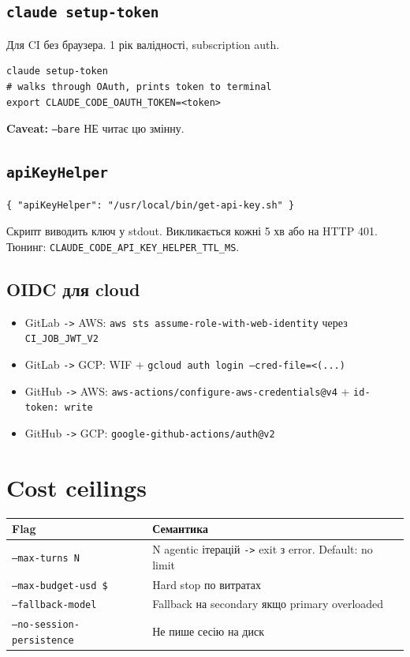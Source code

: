 \documentclass[11pt,a4paper]{article}
\begin{document}
\subsection{\texttt{claude setup-token}}

Для CI без браузера. 1 рік валідності, subscription auth.

\begin{lstlisting}
claude setup-token
# walks through OAuth, prints token to terminal
export CLAUDE_CODE_OAUTH_TOKEN=<token>
\end{lstlisting}

\textbf{Caveat:} \texttt{--bare} НЕ читає цю змінну.

\subsection{\texttt{apiKeyHelper}}

\begin{lstlisting}
{ "apiKeyHelper": "/usr/local/bin/get-api-key.sh" }
\end{lstlisting}

Скрипт виводить ключ у stdout. Викликається кожні 5 хв або на HTTP 401. Тюнинг: \texttt{CLAUDE\_CODE\_API\_KEY\_HELPER\_TTL\_MS}.

\subsection{OIDC для cloud}

\begin{itemize}[leftmargin=2em]
\item GitLab \texttt{->} AWS: \texttt{aws sts assume-role-with-web-identity} через \texttt{CI\_JOB\_JWT\_V2}
\item GitLab \texttt{->} GCP: WIF + \texttt{gcloud auth login --cred-file=<(...)}
\item GitHub \texttt{->} AWS: \texttt{aws-actions/configure-aws-credentials@v4} + \texttt{id-token: write}
\item GitHub \texttt{->} GCP: \texttt{google-github-actions/auth@v2}
\end{itemize}

\section{Cost ceilings}

\begin{tabular}{ll}
\hline
\textbf{Flag} & \textbf{Семантика} \\
\hline
\texttt{--max-turns N} & N agentic ітерацій \texttt{->} exit з error. Default: no limit \\
\texttt{--max-budget-usd \$} & Hard stop по витратах \\
\texttt{--fallback-model} & Fallback на secondary якщо primary overloaded \\
\texttt{--no-session-persistence} & Не пише сесію на диск \\
\hline
\end{tabular}
\end{document}
